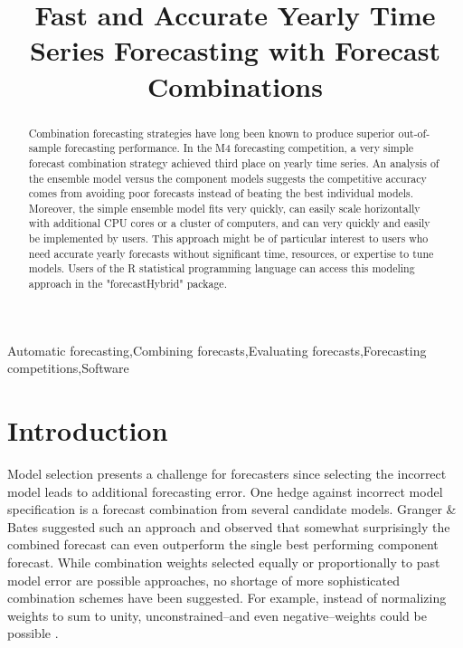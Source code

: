 \documentclass[11pt,3p,review,authoryear]{elsarticle}
\begin{document}
\begin{frontmatter}

\title{Fast and Accurate Yearly Time Series Forecasting with Forecast Combinations}





\begin{abstract}
Combination forecasting strategies have long been known to produce superior out-of-sample forecasting performance. In the M4 forecasting competition, a very simple forecast combination strategy achieved third place on yearly time series. An analysis of the ensemble model versus the component models suggests the competitive accuracy comes from avoiding poor forecasts instead of beating the best individual models. Moreover, the simple ensemble model fits very quickly, can easily scale horizontally with additional CPU cores or a cluster of computers, and can very quickly and easily be implemented by users. This approach might be of particular interest to users who need accurate yearly forecasts without significant time, resources, or expertise to tune models. Users of the R statistical programming language can access this modeling approach in the "forecastHybrid" package.
\end{abstract}

\begin{keyword}
Automatic forecasting\sep Combining forecasts\sep Evaluating forecasts\sep Forecasting competitions\sep Software
\end{keyword}

\end{frontmatter}


\section{Introduction}
Model selection presents a challenge for forecasters since selecting the incorrect model leads to additional forecasting error. One hedge against incorrect model specification is a forecast combination from several candidate models. Granger \& Bates \cite{BatesGranger1969} suggested such an approach and observed that somewhat surprisingly the combined forecast can even outperform the single best performing component forecast. While combination weights selected equally or proportionally to past model error are possible approaches, no shortage of more sophisticated combination schemes have been suggested. For example, instead of normalizing weights to sum to unity, unconstrained--and even negative--weights could be possible \citep{GrangerRamanathan1984}.
\end{document}
